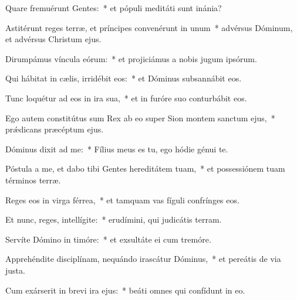 \item Quare fremuérunt Gentes:~* et pópuli meditáti sunt inánia?

\item Astitérunt reges terræ, et príncipes convenérunt in unum~* advérsus Dóminum, et advérsus Christum ejus.

\item Dirumpámus víncula eórum:~* et projiciámus a nobis jugum ipsórum.

\item Qui hábitat in cælis, irridébit eos:~* et Dóminus subsannábit eos.

\item Tunc loquétur ad eos in ira sua,~* et in furóre suo conturbábit eos.

\item Ego autem constitútus sum Rex ab eo super Sion montem sanctum ejus,~* prǽdicans præcéptum ejus.

\item Dóminus dixit ad me:~* Fílius meus es tu, ego hódie génui te.

\item Póstula a me, et dabo tibi Gentes hereditátem tuam,~* et possessiónem tuam términos terræ.

\item Reges eos in virga férrea,~* et tamquam vas fíguli confrínges eos.

\item Et nunc, reges, intellígite:~* erudímini, qui judicátis terram.

\item Servíte Dómino in timóre:~* et exsultáte ei cum tremóre.

\item Apprehéndite disciplínam, nequándo irascátur Dóminus,~* et pereátis de via justa.

\item Cum exárserit in brevi ira ejus:~* beáti omnes qui confídunt in eo.

